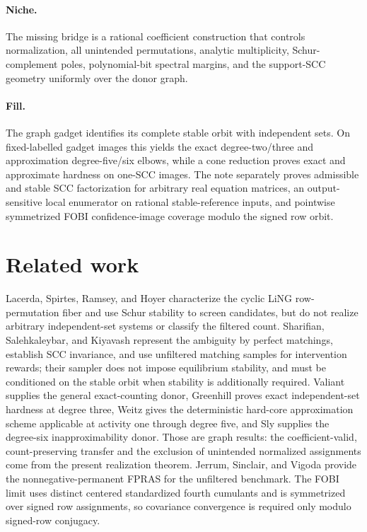 \documentclass{article}
\begin{document}
\paragraph{Niche.} The missing bridge is a rational coefficient construction that controls normalization, all unintended permutations, analytic multiplicity, Schur-complement poles, polynomial-bit spectral margins, and the support-SCC geometry uniformly over the donor graph.

\paragraph{Fill.} The graph gadget identifies its complete stable orbit with independent sets. On fixed-labelled gadget images this yields the exact degree-two/three and approximation degree-five/six elbows, while a cone reduction proves exact and approximate hardness on one-SCC images. The note separately proves admissible and stable SCC factorization for arbitrary real equation matrices, an output-sensitive local enumerator on rational stable-reference inputs, and pointwise symmetrized FOBI confidence-image coverage modulo the signed row orbit.

\section{Related work}

Lacerda, Spirtes, Ramsey, and Hoyer characterize the cyclic LiNG row-permutation fiber and use Schur stability to screen candidates, but do not realize arbitrary independent-set systems or classify the filtered count. Sharifian, Salehkaleybar, and Kiyavash represent the ambiguity by perfect matchings, establish SCC invariance, and use unfiltered matching samples for intervention rewards; their sampler does not impose equilibrium stability, and must be conditioned on the stable orbit when stability is additionally required. Valiant supplies the general exact-counting donor, Greenhill proves exact independent-set hardness at degree three, Weitz gives the deterministic hard-core approximation scheme applicable at activity one through degree five, and Sly supplies the degree-six inapproximability donor. Those are graph results: the coefficient-valid, count-preserving transfer and the exclusion of unintended normalized assignments come from the present realization theorem. Jerrum, Sinclair, and Vigoda provide the nonnegative-permanent FPRAS for the unfiltered benchmark. The FOBI limit uses distinct centered standardized fourth cumulants and is symmetrized over signed row assignments, so covariance convergence is required only modulo signed-row conjugacy.
\end{document}
